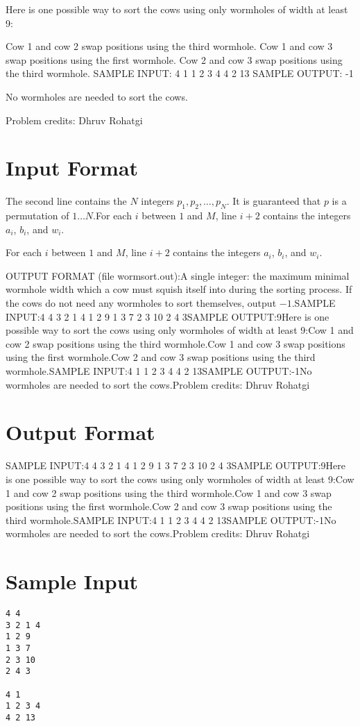 \documentclass[12pt]{article}
\begin{document}
Here is one possible way to sort the cows using only wormholes of width at least
9:

 Cow 1 and cow 2 swap positions using the third wormhole.  Cow 1 and cow 3 swap positions using the first wormhole.  Cow 2 and cow 3 swap positions using the third wormhole. 
SAMPLE INPUT:
4 1
1 2 3 4
4 2 13
SAMPLE OUTPUT: 
-1

No wormholes are needed to sort the cows.


Problem credits: Dhruv Rohatgi



\section*{Input Format}
The second line contains the $N$ integers $p_1, p_2, \dots, p_N$. It is
guaranteed that $p$ is a permutation of $1\ldots N.$For each $i$ between $1$ and $M$, line $i+2$ contains the integers $a_i$, $b_i$,
and $w_i$.

For each $i$ between $1$ and $M$, line $i+2$ contains the integers $a_i$, $b_i$,
and $w_i$.

OUTPUT FORMAT (file wormsort.out):A single integer: the maximum minimal wormhole width which a cow must squish
itself into during the sorting process. If the cows do not need any wormholes to
sort themselves, output $-1$.SAMPLE INPUT:4 4
3 2 1 4
1 2 9
1 3 7
2 3 10
2 4 3SAMPLE OUTPUT:9Here is one possible way to sort the cows using only wormholes of width at least
9:Cow 1 and cow 2 swap positions using the third wormhole.Cow 1 and cow 3 swap positions using the first wormhole.Cow 2 and cow 3 swap positions using the third wormhole.SAMPLE INPUT:4 1
1 2 3 4
4 2 13SAMPLE OUTPUT:-1No wormholes are needed to sort the cows.Problem credits: Dhruv Rohatgi

\section*{Output Format}
SAMPLE INPUT:4 4
3 2 1 4
1 2 9
1 3 7
2 3 10
2 4 3SAMPLE OUTPUT:9Here is one possible way to sort the cows using only wormholes of width at least
9:Cow 1 and cow 2 swap positions using the third wormhole.Cow 1 and cow 3 swap positions using the first wormhole.Cow 2 and cow 3 swap positions using the third wormhole.SAMPLE INPUT:4 1
1 2 3 4
4 2 13SAMPLE OUTPUT:-1No wormholes are needed to sort the cows.Problem credits: Dhruv Rohatgi

\section*{Sample Input}
\begin{verbatim}
4 4
3 2 1 4
1 2 9
1 3 7
2 3 10
2 4 3

4 1
1 2 3 4
4 2 13
\end{verbatim}
\end{document}

